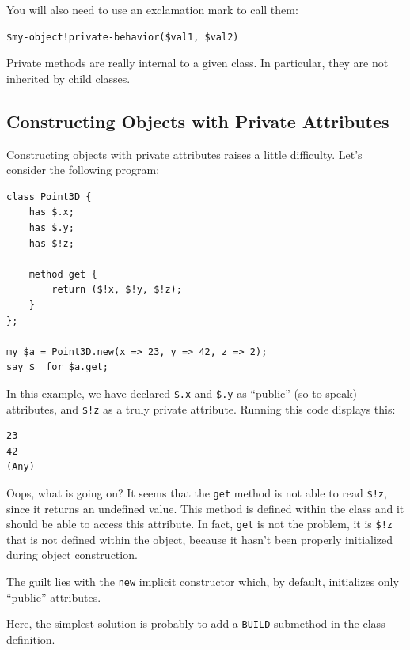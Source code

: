 You will also need to use an exclamation mark to call them:

\begin{verbatim}
$my-object!private-behavior($val1, $val2)
\end{verbatim}

Private methods are really internal to a given class. In 
particular, they are not inherited by child classes.


\subsection{Constructing Objects with Private Attributes}

Constructing objects with private attributes raises a 
little difficulty. Let's consider the following program:

\begin{verbatim}
class Point3D {
    has $.x;
    has $.y;
    has $!z;
    
    method get {
        return ($!x, $!y, $!z);
    }
};

my $a = Point3D.new(x => 23, y => 42, z => 2);
say $_ for $a.get;
\end{verbatim}

In this example, we have declared \verb'$.x' and \verb'$.y' 
as ``public'' (so to speak) attributes, and \verb'$!z' as 
a truly private attribute. Running this code displays this:

\begin{verbatim}
23
42
(Any)
\end{verbatim}

Oops, what is going on? It seems that the {\tt get} 
method is not able to read \verb'$!z', since it returns 
an undefined value. This method is defined within the 
class and it should be able to access this attribute. In 
fact, {\tt get} is not the problem, it is \verb'$!z' that is 
not defined within the object, because it hasn't been properly 
initialized during object construction.

The guilt lies with the {\tt new} implicit constructor which, 
by default, initializes only ``public'' attributes.

Here, the simplest solution is probably to add a {\tt BUILD} 
submethod in the class definition.

